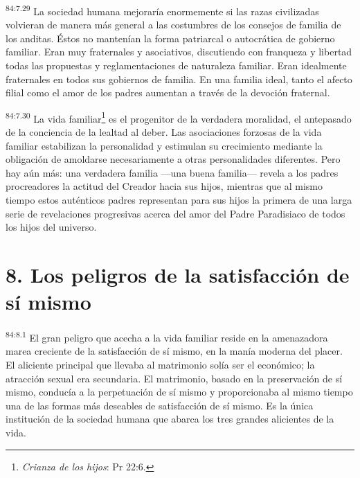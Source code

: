 \documentclass[twoside, 11pt]{book}
\begin{document}
\par
\textsuperscript{84:7.29} La sociedad humana mejoraría enormemente si las razas civilizadas volvieran de manera más general a las costumbres de los consejos de familia de los anditas. Éstos no mantenían la forma patriarcal o autocrática de gobierno familiar. Eran muy fraternales y asociativos, discutiendo con franqueza y libertad todas las propuestas y reglamentaciones de naturaleza familiar. Eran idealmente fraternales en todos sus gobiernos de familia. En una familia ideal, tanto el afecto filial como el amor de los padres aumentan a través de la devoción fraternal.

\par
\textsuperscript{84:7.30} La vida familiar\footnote{\textit{Crianza de los hijos}: Pr 22:6.} es el progenitor de la verdadera moralidad, el antepasado de la conciencia de la lealtad al deber. Las asociaciones forzosas de la vida familiar estabilizan la personalidad y estimulan su crecimiento mediante la obligación de amoldarse necesariamente a otras personalidades diferentes. Pero hay aún más: una verdadera familia ---una buena familia--- revela a los padres procreadores la actitud del Creador hacia sus hijos, mientras que al mismo tiempo estos auténticos padres representan para sus hijos la primera de una larga serie de revelaciones progresivas acerca del amor del Padre Paradisiaco de todos los hijos del universo.

\section*{8. Los peligros de la satisfacción de sí mismo}
\par
\textsuperscript{84:8.1} El gran peligro que acecha a la vida familiar reside en la amenazadora marea creciente de la satisfacción de sí mismo, en la manía moderna del placer. El aliciente principal que llevaba al matrimonio solía ser el económico; la atracción sexual era secundaria. El matrimonio, basado en la preservación de sí mismo, conducía a la perpetuación de sí mismo y proporcionaba al mismo tiempo una de las formas más deseables de satisfacción de sí mismo. Es la única institución de la sociedad humana que abarca los tres grandes alicientes de la vida.
\end{document}
